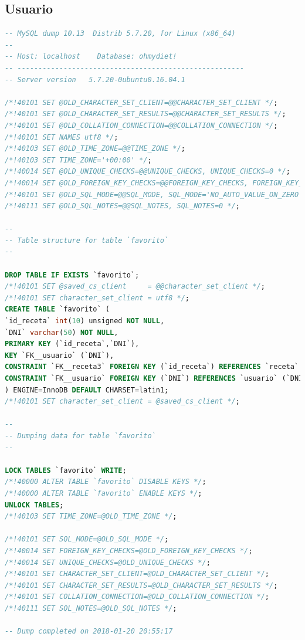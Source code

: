 \documentclass[12pt,letterpaper]{article}
\begin{document}
\subsection{Usuario}
\begin{lstlisting}[language=sql]
-- MySQL dump 10.13  Distrib 5.7.20, for Linux (x86_64)
--
-- Host: localhost    Database: ohmydiet!
-- ------------------------------------------------------
-- Server version	5.7.20-0ubuntu0.16.04.1

/*!40101 SET @OLD_CHARACTER_SET_CLIENT=@@CHARACTER_SET_CLIENT */;
/*!40101 SET @OLD_CHARACTER_SET_RESULTS=@@CHARACTER_SET_RESULTS */;
/*!40101 SET @OLD_COLLATION_CONNECTION=@@COLLATION_CONNECTION */;
/*!40101 SET NAMES utf8 */;
/*!40103 SET @OLD_TIME_ZONE=@@TIME_ZONE */;
/*!40103 SET TIME_ZONE='+00:00' */;
/*!40014 SET @OLD_UNIQUE_CHECKS=@@UNIQUE_CHECKS, UNIQUE_CHECKS=0 */;
/*!40014 SET @OLD_FOREIGN_KEY_CHECKS=@@FOREIGN_KEY_CHECKS, FOREIGN_KEY_CHECKS=0 */;
/*!40101 SET @OLD_SQL_MODE=@@SQL_MODE, SQL_MODE='NO_AUTO_VALUE_ON_ZERO' */;
/*!40111 SET @OLD_SQL_NOTES=@@SQL_NOTES, SQL_NOTES=0 */;

--
-- Table structure for table `favorito`
--

DROP TABLE IF EXISTS `favorito`;
/*!40101 SET @saved_cs_client     = @@character_set_client */;
/*!40101 SET character_set_client = utf8 */;
CREATE TABLE `favorito` (
`id_receta` int(10) unsigned NOT NULL,
`DNI` varchar(50) NOT NULL,
PRIMARY KEY (`id_receta`,`DNI`),
KEY `FK__usuario` (`DNI`),
CONSTRAINT `FK__receta3` FOREIGN KEY (`id_receta`) REFERENCES `receta` (`id_receta`),
CONSTRAINT `FK__usuario` FOREIGN KEY (`DNI`) REFERENCES `usuario` (`DNI`)
) ENGINE=InnoDB DEFAULT CHARSET=latin1;
/*!40101 SET character_set_client = @saved_cs_client */;

--
-- Dumping data for table `favorito`
--

LOCK TABLES `favorito` WRITE;
/*!40000 ALTER TABLE `favorito` DISABLE KEYS */;
/*!40000 ALTER TABLE `favorito` ENABLE KEYS */;
UNLOCK TABLES;
/*!40103 SET TIME_ZONE=@OLD_TIME_ZONE */;

/*!40101 SET SQL_MODE=@OLD_SQL_MODE */;
/*!40014 SET FOREIGN_KEY_CHECKS=@OLD_FOREIGN_KEY_CHECKS */;
/*!40014 SET UNIQUE_CHECKS=@OLD_UNIQUE_CHECKS */;
/*!40101 SET CHARACTER_SET_CLIENT=@OLD_CHARACTER_SET_CLIENT */;
/*!40101 SET CHARACTER_SET_RESULTS=@OLD_CHARACTER_SET_RESULTS */;
/*!40101 SET COLLATION_CONNECTION=@OLD_COLLATION_CONNECTION */;
/*!40111 SET SQL_NOTES=@OLD_SQL_NOTES */;

-- Dump completed on 2018-01-20 20:55:17

\end{lstlisting}
\end{document}
